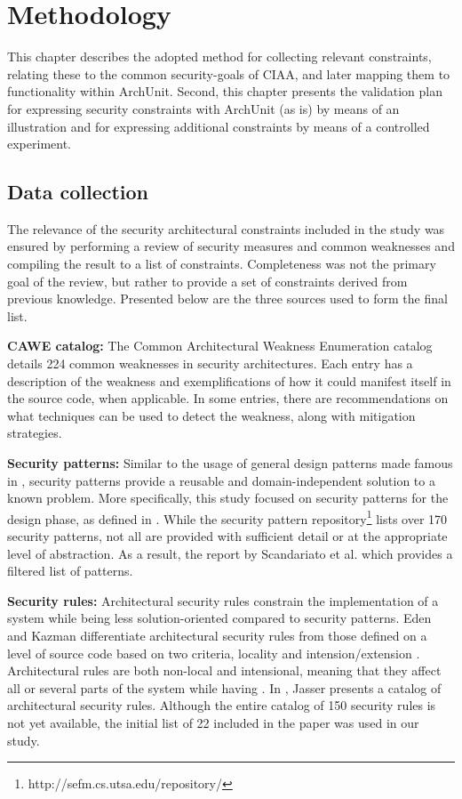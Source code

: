 \chapter{Methodology}

This chapter describes the adopted method for collecting relevant constraints, relating these to the common security-goals of CIAA, and later mapping them to functionality within ArchUnit. Second, this chapter presents the validation plan for expressing security constraints with ArchUnit (as is) by means of an illustration and for expressing additional constraints by means of a controlled experiment.

\section{Data collection}

The relevance of the security architectural constraints included in the study was ensured by performing a review of security measures and common weaknesses and compiling the result to a list of constraints. Completeness was not the primary goal of the review, but rather to provide a set of constraints derived from previous knowledge. Presented below are the three sources used to form the final list. 

\textbf{CAWE catalog:}
The Common Architectural Weakness Enumeration catalog \cite{santos_catalog_2017} details 224 common weaknesses in security architectures. Each entry has a description of the weakness and exemplifications of how it could manifest itself in the source code, when applicable. In some entries, there are recommendations on what techniques can be used to detect the weakness, along with mitigation strategies.

\textbf{Security patterns:}
Similar to the usage of general design patterns made famous in \cite{gamma_design_1995}, security patterns provide a reusable and domain-independent solution to a known problem. More specifically, this study focused on security patterns for the design phase, as defined in \cite{yoshioka_survey_2008}. While the security pattern repository\footnote{http://sefm.cs.utsa.edu/repository/} lists over 170 security patterns, not all are provided with sufficient detail or at the appropriate level of abstraction. As a result, the report by Scandariato et al. \cite{scandariato_system_2006}  which provides a filtered list of patterns.


\textbf{Security rules:}
Architectural security rules constrain the implementation of a system while being less solution-oriented compared to security patterns. Eden and Kazman differentiate architectural security rules from those defined on a level of source code based on two criteria, locality and intension/extension \cite{eden_architecture_2003}. Architectural rules are both non-local and intensional, meaning that they affect all or several parts of the system while having . In \cite{franch_constraining_2019}, Jasser presents a catalog of architectural security rules. Although the entire catalog of 150 security rules is not yet available, the initial list of 22 included in the paper was used in our study.

